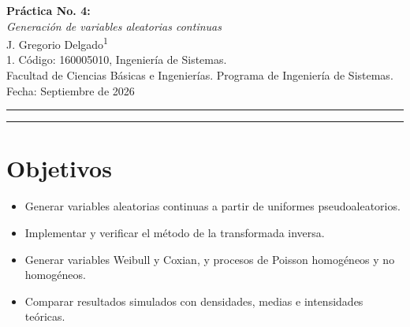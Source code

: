 \documentclass[11pt,a4paper]{article}
\newcommand{\TituloInforme}{Práctica No. 4:}
\newcommand{\NombrePractica}{Generación de variables aleatorias continuas}
\newcommand{\NombreFacultad}{Facultad de Ciencias Básicas e Ingenierías}
\newcommand{\NombrePrograma}{Programa de Ingeniería de Sistemas}
\newcommand{\FechaInforme}{Septiembre de 2026}
\newcommand{\AlumnoUno}{J. Gregorio Delgado}
\newcommand{\CodUno}{160005010}
\begin{document}
\begin{center}
 {\LARGE\bfseries \TituloInforme}\\[6pt]
 {\normalsize\itshape \NombrePractica}\\[16pt]
 {\large \AlumnoUno\textsuperscript{1}}\\[12pt]
 {\small 1. Código: \CodUno, Ingeniería de Sistemas.}\\[10pt]
 {\small \NombreFacultad. \NombrePrograma.}\\[4pt]
 {\small Fecha: \FechaInforme}
\end{center}

\vspace{.4cm}\rule{\textwidth}{.6pt}
\begin{abstract}
Se implementaron métodos para generar variables aleatorias continuas y procesos de
conteo a partir de un generador congruencial mixto de período completo. Mediante
transformada inversa se obtuvieron cuatro muestras de 1000 observaciones y se
contrastaron sus histogramas con las densidades teóricas. También se simularon un
proceso de Poisson homogéneo, una variable Coxian y un proceso de Poisson no homogéneo
mediante adelgazamiento. Las medias y los conteos empíricos fueron cercanos a sus
valores teóricos, lo que respalda las implementaciones.

\medskip\noindent\textbf{Palabras clave ---} transformada inversa, Weibull,
generador congruencial, proceso de Poisson, Coxian, adelgazamiento.
\end{abstract}
\rule{\textwidth}{.6pt}

\section{Objetivos}
\begin{itemize}
 \item Generar variables aleatorias continuas a partir de uniformes pseudoaleatorios.
 \item Implementar y verificar el método de la transformada inversa.
 \item Generar variables Weibull y Coxian, y procesos de Poisson homogéneos y no homogéneos.
 \item Comparar resultados simulados con densidades, medias e intensidades teóricas.
\end{itemize}
\end{document}
